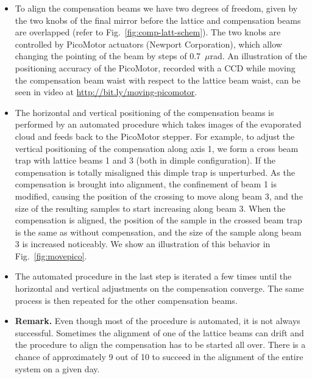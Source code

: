 \begin{itemize}
\item   To align the compensation beams we have two degrees of freedom, given
by the two knobs of the final mirror before the lattice and compensation beams
are overlapped (refer to Fig.~\ref{fig:comp-latt-schem}).  The two knobs are
controlled by PicoMotor actuators (Newport Corporation), which allow changing
the pointing of the beam by steps of 0.7~$\mu$rad.  An illustration of the
positioning accuracy of the PicoMotor, recorded with a CCD while moving the
compensation beam waist with respect to the lattice beam waist, can be seen in
video at \url{http://bit.ly/moving-picomotor}.

\item  The horizontal and vertical positioning of the compensation beams is
performed by an automated procedure which takes images of the evaporated cloud
and feeds back to the PicoMotor stepper.  For example, to adjust the vertical
positioning of the compensation along axis 1, we form a cross beam trap with
lattice beams 1 and 3 (both in dimple configuration).  If the compensation is
totally misaligned this dimple trap is unperturbed.  As the compensation is
brought into alignment,  the confinement of beam 1 is modified, causing the
position of the crossing to move along beam 3, and the size of the resulting
samples to start increasing along beam 3.   When the compensation is aligned,
the position of the sample in the crossed beam trap is the same as without
compensation, and the size of the sample along beam 3 is increased noticeably.
We show an illustration of this behavior in Fig.~\ref{fig:movepico}.   

\item  The automated procedure in the last step is iterated a few times until
the horizontal and vertical adjustments on the compensation converge.  The same
process is then repeated for the other compensation beams. 

\item  \textbf{Remark.}  Even though most of the procedure is automated, it is
not always successful.  Sometimes the alignment of one of the lattice beams can
drift and the procedure to align the compensation has to be started all over.
There is a chance of approximately 9 out of 10 to succeed in the alignment of
the entire system on a given day.  
\end{itemize} 
